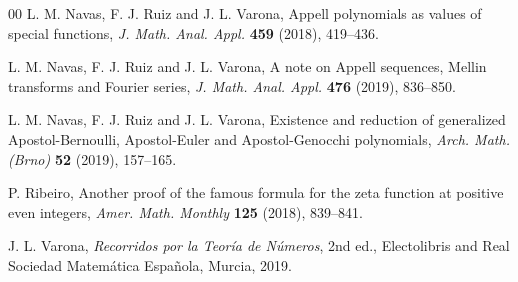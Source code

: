 \documentclass[11pt, oneside]{article}
\theoremstyle{plain}
\theoremstyle{definition}
\begin{document}
\begin{thebibliography}{00}
L. M. Navas, F. J. Ruiz and J. L. Varona, 
Appell polynomials as values of special functions, 
\textit{J. Math. Anal. Appl.} \textbf{459} (2018), 419--436. 

L. M. Navas, F. J. Ruiz and J. L. Varona, 
A note on Appell sequences, Mellin transforms and Fourier series, 
\textit{J. Math. Anal. Appl.} \textbf{476} (2019), 836--850. 

L. M. Navas, F. J. Ruiz and J. L. Varona, 
Existence and reduction of generalized Apostol-Bernoulli, Apostol-Euler and Apostol-Genocchi polynomials, 
\textit{Arch. Math. (Brno)} \textbf{52} (2019), 157--165.

P. Ribeiro, 
{Another proof of the famous formula for the zeta function at positive even integers}, 
\textit{Amer. Math. Monthly} \textbf{125} (2018), 839--841. %

J. L. Varona, 
\textit{Recorridos por la Teor\'ia de N\'umeros}, 2nd ed.,
Electolibris and Real Sociedad Matem\'atica Espa\~nola, Murcia, 2019.


\end{thebibliography}

\end{document}
